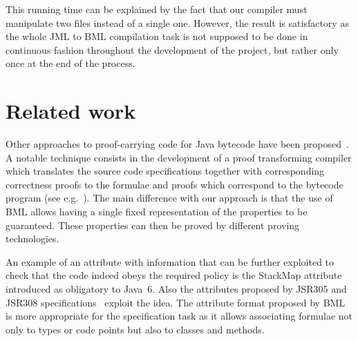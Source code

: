 \documentclass{llncs}
\begin{document}
This running time can be explained by the fact that our compiler must
manipulate two files instead of a single one. However, the result is
satisfactory as the whole JML to BML compilation task is not supposed
to be done in continuous fashion throughout the development of the
project, but rather only once at the end of the process.

\vspace{-0.5\baselineskip}

\section{Related work}
\label{sec:related-work}

\vspace{-0.5\baselineskip}

Other approaches to proof-carrying code for Java bytecode have been
proposed~\cite{gilmore05:_proof,wildmoser04:_prototy}. A notable
technique consists in the development of a proof transforming compiler
which translates the source code specifications together with
corresponding correctness proofs to the formulae and proofs which
correspond to the bytecode program (see
e.g.~\cite{barthe06:_certif_trans_optim_compil}). The main difference
with our approach is that the use of BML allows having a single fixed
representation of the properties to be guaranteed. These properties
can then be proved by different proving technologies.

An example of an attribute with information that can be further
exploited to check that the code indeed obeys the required policy is
the StackMap attribute introduced as obligatory to Java~6.  Also the
attributes proposed by JSR305 and JSR308
specifications~\cite{JSR305,JSR308} exploit the idea. The attribute
format proposed by BML is more appropriate for the specification task
as it allows associating formulae not only to types or code points
but also to classes and methods.
\end{document}
